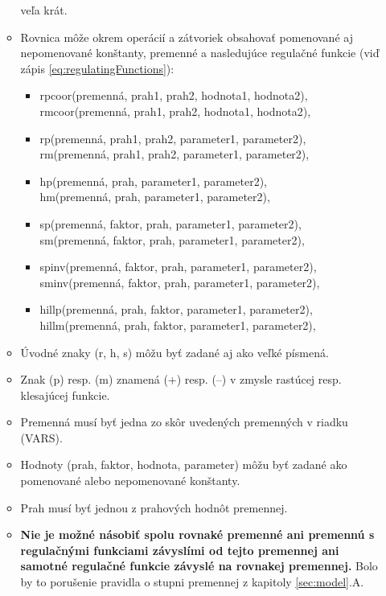 \documentclass[11pt,final,oneside]{fithesis}
\begin{document}
\begin{enumerate}
\begin{itemize}
ve\v la kr\'at.
\item Rovnica m\^ o\v ze okrem oper\'aci\'i a z\'atvoriek obsahova\v t pomenovan\'e aj nepomenovan\'e kon\v stanty, premenn\'e a nasleduj\'uce regula\v cn\'e 
funkcie (vi\v d z\'apis \ref{eq:regulatingFunctions}):
\begin{itemize}
\item rpcoor(premenn\'a, prah1, prah2, hodnota1, hodnota2), \\rmcoor(premenn\'a, prah1, prah2, hodnota1, hodnota2),
\item rp(premenn\'a, prah1, prah2, parameter1, parameter2),\\rm(premenn\'a, prah1, prah2, parameter1, parameter2),
\item hp(premenn\'a, prah, parameter1, parameter2),\\hm(premenn\'a, prah, parameter1, parameter2),
\item sp(premenn\'a, faktor, prah, parameter1, parameter2),\\sm(premenn\'a, faktor, prah, parameter1, parameter2),
\item spinv(premenn\'a, faktor, prah, parameter1, parameter2),\\sminv(premenn\'a, faktor, prah, parameter1, parameter2),
\item hillp(premenn\'a, prah, faktor, parameter1, parameter2),\\hillm(premenn\'a, prah, faktor, parameter1, parameter2),
\end{itemize}
\item \' Uvodn\'e znaky (r, h, s) m\^ o\v zu by\v t zadan\'e aj ako ve\v lk\'e p\'ismen\'a.
\item Znak (p) resp. (m) znamen\'a (+) resp. (--) v zmysle rast\'ucej resp. klesaj\'ucej funkcie.
\item Premenn\'a mus\'i by\v t jedna zo sk\^ or uveden\'ych premenn\'ych v riadku (VARS).
\item Hodnoty (prah, faktor, hodnota, parameter) m\^ o\v zu by\v t zadan\'e ako pomenovan\'e alebo nepomenovan\'e kon\v stanty.
\item Prah mus\'i by\v t jednou z prahov\'ych hodn\^ ot premennej.
\item \textbf{Nie je mo\v zn\'e n\'asobi\v t spolu rovnak\'e premenn\'e ani premenn\'u s regula\v cn\'ymi funkciami z\'avysl\'imi od tejto premennej ani
samotn\'e regula\v cn\'e funkcie z\'avysl\'e na rovnakej premennej.} Bolo by to poru\v senie pravidla o stupni premennej z kapitoly \ref{sec:model}.A.
\end{itemize}
\end{enumerate}
\end{document}
